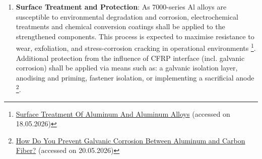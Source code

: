 \begin{enumerate}

    \item \textbf{Surface Treatment and Protection}: As 7000-series Al alloys are susceptible to environmental degradation and corrosion, electrochemical treatments and chemical conversion coatings shall be applied to the strengthened components. This process is expected to maximise resistance to wear, exfoliation, and stress-corrosion cracking in operational environments \footnote{\href{https://www.totalmateria.com/en-us/articles/surface-treatment-of-aluminum/}{Surface Treatment Of Aluminum And Aluminum Alloys} (accessed on 18.05.2026)}. Additional protection from the influence of CFRP interface (incl. galvanic corrosion) shall be applied via means such as: a galvanic isolation layer, anodising and priming, fastener isolation, or implementing a sacrificial anode \footnote{\label{corosion_cit}\href{https://medium.com/@18981879860/how-do-you-prevent-galvanic-corrosion-between-aluminum-and-carbon-fiber-277d07a72760}{How Do You Prevent Galvanic Corrosion Between Aluminum and Carbon Fiber?} (accessed on 20.05.2026)}.
    

\end{enumerate}

